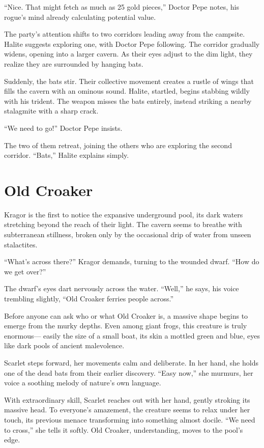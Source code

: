 \documentclass[
  letterpaper,12pt,twoside,twocolumn,openany,
  nodeprecatedcode,bg=full]{dndbook}
\begin{document}
``Nice. That might fetch as much as 25 gold pieces,'' Doctor Pepe notes,
his rogue's mind already calculating potential value.

The party's attention shifts to two corridors leading away from the
campsite. Halite suggests exploring one, with Doctor Pepe following. The
corridor gradually widens, opening into a larger cavern. As their eyes
adjust to the dim light, they realize they are surrounded by hanging
bats.

Suddenly, the bats stir. Their collective movement creates a rustle of
wings that fills the cavern with an ominous sound. Halite, startled,
begins stabbing wildly with his trident. The weapon misses the bats
entirely, instead striking a nearby stalagmite with a sharp crack.

``We need to go!'' Doctor Pepe insists.

The two of them retreat, joining the others who are exploring the second
corridor. ``Bats,'' Halite explains simply.

\section{Old Croaker}\label{old-croaker}

Kragor is the first to notice the expansive underground pool, its dark
waters stretching beyond the reach of their light. The cavern seems to
breathe with subterranean stillness, broken only by the occasional drip
of water from unseen stalactites.

``What's across there?'' Kragor demands, turning to the wounded dwarf.
``How do we get over?''

The dwarf's eyes dart nervously across the water. ``Well,'' he says, his
voice trembling slightly, ``Old Croaker ferries people across.''

Before anyone can ask who or what Old Croaker is, a massive shape begins
to emerge from the murky depths. Even among giant frogs, this creature
is truly enormous--- easily the size of a small boat, its skin a mottled
green and blue, eyes like dark pools of ancient malevolence.

Scarlet steps forward, her movements calm and deliberate. In her hand,
she holds one of the dead bats from their earlier discovery. ``Easy
now,'' she murmurs, her voice a soothing melody of nature's own
language.

With extraordinary skill, Scarlet reaches out with her hand, gently
stroking its massive head. To everyone's amazement, the creature seems
to relax under her touch, its previous menace transforming into
something almost docile. ``We need to cross,'' she tells it softly. Old
Croaker, understanding, moves to the pool's edge.
\end{document}
